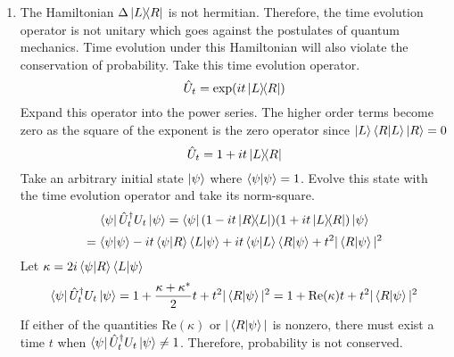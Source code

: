 \begin{sol}
\begin{enumerate}[label=\textbf{(\alph*)}]
\item
The Hamiltonian $\Delta\ketbra{L}{R}$ is not hermitian. Therefore, the time evolution operator is not unitary which goes against the postulates of quantum mechanics. Time evolution under this Hamiltonian will also violate the conservation of probability. Take this time evolution operator.
$$\hat U_t=\exp(it\ketbra{L}{R})$$ 
Expand this operator into the power series. The higher order terms become zero as the square of the exponent is the zero operator since $\ket L\braket{R}{L}\ket R=0$
$$\hat U_t=1+it\ketbra{L}{R}$$
Take an arbitrary initial state $\ket\psi$ where $\braket{\psi}{\psi}=1$. Evolve this state with the time evolution operator and take its norm-square.
$$\bra\psi\hat U_t^\dagger U_t\ket\psi=\bra\psi(1-it\ketbra{R}{L})(1+it\ketbra{L}{R})\ket\psi$$
$$=\braket{\psi}{\psi}-it\braket{\psi}{R}\braket{L}{\psi}+it\braket{\psi}{L}\braket{R}{\psi}+t^2|\braket{R}{\psi}|^2$$
Let $\kappa=2i\braket{\psi}{R}\braket{L}{\psi}$
$$\bra\psi\hat U_t^\dagger U_t\ket\psi=1+\frac{\kappa+\kappa^*}{2}t+t^2|\braket{R}{\psi}|^2=1+\text{Re}(\kappa)t+t^2|\braket{R}{\psi}|^2$$
If either of the quantities $\text{Re}(\kappa)$ or $|\braket{R}{\psi}|$ is nonzero, there must exist a time $t$ when $\bra\psi\hat U_t^\dagger U_t\ket\psi\neq 1$. Therefore, probability is not conserved. 
\end{enumerate}
\end{sol}